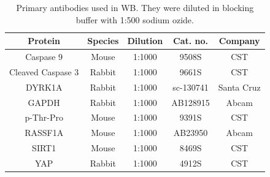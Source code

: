 \documentclass[onecolumn,10pt]{asme2ej}
\begin{document}
\begin{table}[]
	\centering
	\caption{Primary antibodies used in WB. They were diluted in blocking buffer with 1:500 sodium ozide.}
	\label{AbWB}
	\begin{tabular}{ccccc}
		\rowcolor{white}
		\hline
		\textbf{Protein}  & \textbf{Species} & \textbf{Dilution} & \textbf{Cat. no.} & \textbf{Company} \\ \hline
		Caspase 9         & Mouse            & 1:1000            & 9508S                 & CST              \\
		Cleaved Caspase 3 & Rabbit           & 1:1000            & 9661S                 & CST              \\
		DYRK1A            & Rabbit           & 1:1000            & sc-130741             & Santa Cruz       \\
		GAPDH             & Rabbit           & 1:1000            & AB128915              & Abcam            \\
		p-Thr-Pro         & Mouse            & 1:1000            & 9391S                 & CST              \\
		RASSF1A			  & Mouse			 & 1:1000			 & AB23950				 & Abcam			\\ 
		SIRT1             & Mouse            & 1:1000            & 8469S                 & CST              \\
		YAP               & Rabbit           & 1:1000            & 4912S                 & CST           
	\end{tabular}
\end{table}
\end{document}
